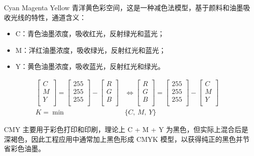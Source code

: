 \documentclass{article}
\begin{document}
Cyan Magenta Yellow 青洋黄色彩空间，这是一种减色法模型，基于颜料和油墨吸收光线的特性，通道含义：

\begin{itemize}
    \item C：青色油墨浓度，吸收红光，反射绿光和蓝光；
    \item M：洋红油墨浓度，吸收绿光，反射红光和蓝光；
    \item Y：黄色油墨浓度，吸收蓝光，反射红光和绿光。
\end{itemize}
\begin{align*}
    \left[\begin{matrix}
        C \\
        M \\
        Y \\
    \end{matrix}\right]=\left[\begin{matrix}
        255 \\
        255 \\
        255 \\
    \end{matrix}\right]-\left[\begin{matrix}
        R \\
        G \\
        B \\
    \end{matrix}\right]&\Longleftrightarrow\left[\begin{matrix}
        R \\
        G \\
        B \\
    \end{matrix}\right]=\left[\begin{matrix}
        255 \\
        255 \\
        255 \\
    \end{matrix}\right]-\left[\begin{matrix}
        C \\
        M \\
        Y \\
    \end{matrix}\right]
    \\
    K=\min&\{C,\ M,\ Y\}
\end{align*}

CMY 主要用于彩色打印和印刷，理论上 C + M + Y 为黑色，但实际上混合后是深褐色，因此工程应用中通常加上黑色形成 CMYK 模型，以获得纯正的黑色并节省彩色油墨。
\end{document}
